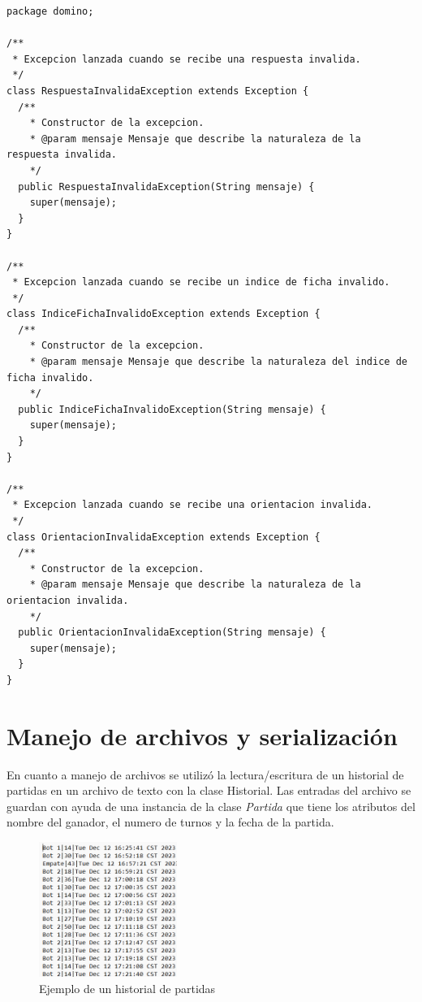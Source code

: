 \documentclass[12pt]{article}
\begin{document}
  \begin{lstlisting}
package domino;

/**
 * Excepcion lanzada cuando se recibe una respuesta invalida.
 */
class RespuestaInvalidaException extends Exception {
  /**
    * Constructor de la excepcion.
    * @param mensaje Mensaje que describe la naturaleza de la respuesta invalida.
    */
  public RespuestaInvalidaException(String mensaje) {
    super(mensaje);
  }
}

/**
 * Excepcion lanzada cuando se recibe un indice de ficha invalido.
 */
class IndiceFichaInvalidoException extends Exception {
  /**
    * Constructor de la excepcion.
    * @param mensaje Mensaje que describe la naturaleza del indice de ficha invalido.
    */
  public IndiceFichaInvalidoException(String mensaje) {
    super(mensaje);
  }
}

/**
 * Excepcion lanzada cuando se recibe una orientacion invalida.
 */
class OrientacionInvalidaException extends Exception {
  /**
    * Constructor de la excepcion.
    * @param mensaje Mensaje que describe la naturaleza de la orientacion invalida.
    */
  public OrientacionInvalidaException(String mensaje) {
    super(mensaje);
  }
}
  \end{lstlisting}

  \section{Manejo de archivos y serialización}
  En cuanto a manejo de archivos se utilizó la lectura/escritura de un historial de partidas en un archivo de texto con la clase Historial. Las entradas del archivo se guardan con ayuda de una instancia de la clase \textit{Partida} que tiene los atributos del nombre del ganador, el numero de turnos y la fecha de la partida.
  
  \begin{figure}[h!]
    \centering
    \includegraphics[width=0.4\textwidth]{historial.png}
    \caption{Ejemplo de un historial de partidas}
  \end{figure}
 
\end{document}
